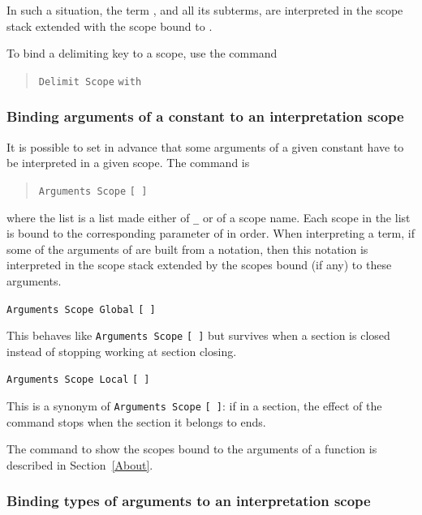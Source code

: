 In such a situation, the term {\term}, and all its subterms, are
interpreted in the scope stack extended with the scope bound to
{\delimkey}.

To bind a delimiting key to a scope, use the command

\begin{quote}
\texttt{Delimit Scope} {\scope} \texttt{with} {\ident} 
\end{quote}

\subsubsection{Binding arguments of a constant to an interpretation scope
}

It is possible to set in advance that some arguments of a given
constant have to be interpreted in a given scope. The command is
\begin{quote}
{\tt Arguments Scope} {\qualid} {\tt [ \nelist{\optscope}{} ]}
\end{quote}
where the list is a list made either of {\tt \_} or of a scope name.
Each scope in the list is bound to the corresponding parameter of
{\qualid} in order.  When interpreting a term, if some of the
arguments of {\qualid} are built from a notation, then this notation
is interpreted in the scope stack extended by the scopes bound (if any)
to these arguments.

\begin{Variants}
\item {\tt Arguments Scope Global} {\qualid} {\tt [ \nelist{\optscope}{} ]}

This behaves like {\tt Arguments Scope} {\qualid} {\tt [
\nelist{\optscope}{} ]} but survives when a section is closed instead
of stopping working at section closing.

\item {\tt Arguments Scope Local} {\qualid} {\tt [ \nelist{\optscope}{} ]}

This is a synonym of {\tt Arguments Scope} {\qualid} {\tt [
\nelist{\optscope}{} ]}: if in a section, the effect of the command
stops when the section it belongs to ends.
\end{Variants}


\SeeAlso The command to show the scopes bound to the arguments of a
function is described in Section~\ref{About}.

\subsubsection{Binding types of arguments to an interpretation scope}

